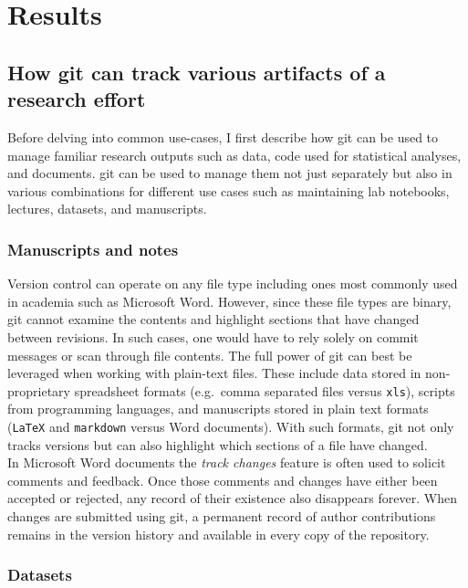 \documentclass[]{article}
\begin{document}
\section{Results}

\subsection{How git can track various artifacts of a research effort}

Before delving into common use-cases, I first describe how git can be
used to manage familiar research outputs such as data, code used for
statistical analyses, and documents. git can be used to manage them not
just separately but also in various combinations for different use cases
such as maintaining lab notebooks, lectures, datasets, and manuscripts.

\subsubsection{Manuscripts and notes}

Version control can operate on any file type including ones most
commonly used in academia such as Microsoft Word. However, since these
file types are binary, git cannot examine the contents and highlight
sections that have changed between revisions. In such cases, one would
have to rely solely on commit messages or scan through file contents.
The full power of git can best be leveraged when working with plain-text
files. These include data stored in non-proprietary spreadsheet formats
(e.g.~comma separated files versus \texttt{xls}), scripts from
programming languages, and manuscripts stored in plain text formats
(\texttt{LaTeX} and \texttt{markdown} versus Word documents). With such
formats, git not only tracks versions but can also highlight which
sections of a file have changed.\\In Microsoft Word documents the
\emph{track changes} feature is often used to solicit comments and
feedback. Once those comments and changes have either been accepted or
rejected, any record of their existence also disappears forever. When
changes are submitted using git, a permanent record of author
contributions remains in the version history and available in every copy
of the repository.

\subsubsection{Datasets}
\end{document}
